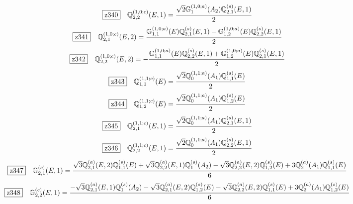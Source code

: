 \documentclass[fleqn,10pt,landscape]{jsarticle}
\begin{document}
\begin{dmath*}
\hspace*{3mm}\fbox{z340}\quad \mathbb{Q}_{2,2}^{(1,0;c)}(E,1)=\frac{\sqrt{2} \mathbb{G}_{1}^{(1,0;a)}(A_{2}) \mathbb{Q}_{2,1}^{(s)}(E,1)}{2}
\end{dmath*}
\begin{dmath*}
\hspace*{3mm}\fbox{z341}\quad \mathbb{Q}_{2,1}^{(1,0;c)}(E,2)=\frac{\mathbb{G}_{1,1}^{(1,0;a)}(E) \mathbb{Q}_{2,1}^{(s)}(E,1) - \mathbb{G}_{1,2}^{(1,0;a)}(E) \mathbb{Q}_{2,2}^{(s)}(E,1)}{2}
\end{dmath*}
\begin{dmath*}
\hspace*{3mm}\fbox{z342}\quad \mathbb{Q}_{2,2}^{(1,0;c)}(E,2)=- \frac{\mathbb{G}_{1,1}^{(1,0;a)}(E) \mathbb{Q}_{2,2}^{(s)}(E,1) + \mathbb{G}_{1,2}^{(1,0;a)}(E) \mathbb{Q}_{2,1}^{(s)}(E,1)}{2}
\end{dmath*}
\begin{dmath*}
\hspace*{3mm}\fbox{z343}\quad \mathbb{Q}_{1,1}^{(1,1;c)}(E)=\frac{\sqrt{2} \mathbb{Q}_{0}^{(1,1;a)}(A_{1}) \mathbb{Q}_{1,1}^{(s)}(E)}{2}
\end{dmath*}
\begin{dmath*}
\hspace*{3mm}\fbox{z344}\quad \mathbb{Q}_{1,2}^{(1,1;c)}(E)=\frac{\sqrt{2} \mathbb{Q}_{0}^{(1,1;a)}(A_{1}) \mathbb{Q}_{1,2}^{(s)}(E)}{2}
\end{dmath*}
\begin{dmath*}
\hspace*{3mm}\fbox{z345}\quad \mathbb{Q}_{2,1}^{(1,1;c)}(E,1)=\frac{\sqrt{2} \mathbb{Q}_{0}^{(1,1;a)}(A_{1}) \mathbb{Q}_{2,1}^{(s)}(E,1)}{2}
\end{dmath*}
\begin{dmath*}
\hspace*{3mm}\fbox{z346}\quad \mathbb{Q}_{2,2}^{(1,1;c)}(E,1)=\frac{\sqrt{2} \mathbb{Q}_{0}^{(1,1;a)}(A_{1}) \mathbb{Q}_{2,2}^{(s)}(E,1)}{2}
\end{dmath*}
\begin{dmath*}
\hspace*{3mm}\fbox{z347}\quad \mathbb{G}_{2,1}^{(c)}(E,1)=\frac{\sqrt{3} \mathbb{Q}_{2,1}^{(a)}(E,2) \mathbb{Q}_{1,1}^{(s)}(E) + \sqrt{3} \mathbb{Q}_{2,2}^{(a)}(E,1) \mathbb{Q}_{1}^{(s)}(A_{2}) - \sqrt{3} \mathbb{Q}_{2,2}^{(a)}(E,2) \mathbb{Q}_{1,2}^{(s)}(E) + 3 \mathbb{Q}_{2}^{(a)}(A_{1}) \mathbb{Q}_{1,1}^{(s)}(E)}{6}
\end{dmath*}
\begin{dmath*}
\hspace*{3mm}\fbox{z348}\quad \mathbb{G}_{2,2}^{(c)}(E,1)=\frac{- \sqrt{3} \mathbb{Q}_{2,1}^{(a)}(E,1) \mathbb{Q}_{1}^{(s)}(A_{2}) - \sqrt{3} \mathbb{Q}_{2,1}^{(a)}(E,2) \mathbb{Q}_{1,2}^{(s)}(E) - \sqrt{3} \mathbb{Q}_{2,2}^{(a)}(E,2) \mathbb{Q}_{1,1}^{(s)}(E) + 3 \mathbb{Q}_{2}^{(a)}(A_{1}) \mathbb{Q}_{1,2}^{(s)}(E)}{6}
\end{dmath*}
\end{document}
